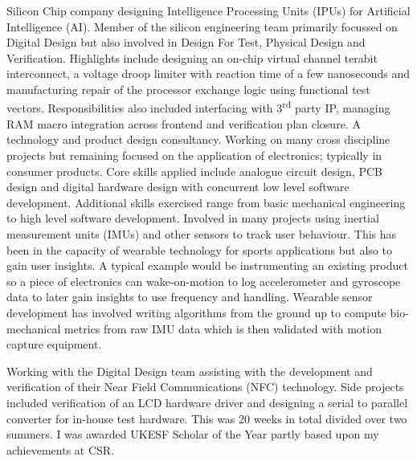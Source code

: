 \documentclass[11pt,a4paper,sans]{moderncv}
\begin{document}
      { Silicon Chip company designing Intelligence Processing Units (IPUs) for Artificial Intelligence (AI). 
        Member of the silicon engineering team primarily focussed on Digital Design but also involved in Design For Test, 
        Physical Design and Verification. Highlights include designing an on-chip virtual channel terabit interconnect, 
        a voltage droop limiter with reaction time of a few nanoseconds and manufacturing repair of the processor exchange logic
        using functional test vectors. Responsibilities also included interfacing with 3\textsuperscript{rd} party IP, managing RAM macro
        integration across frontend and verification plan closure.
        }
        {}
      {  A technology and product design consultancy. 
         Working on many cross discipline projects but remaining focused on the application of electronics; typically in consumer products.
         Core skills applied include analogue circuit design, PCB design and digital hardware design with concurrent low level software development. 
         Additional skills exercised range from basic mechanical engineering to high level software development.       
        Involved in many projects using inertial measurement units (IMUs) and other sensors to track user behaviour. This has been in the capacity of wearable technology for sports applications but also to gain user insights. A typical example would be instrumenting an existing product so a piece of electronics can wake-on-motion to log accelerometer and gyroscope data to later gain insights to use frequency and handling. Wearable sensor development has involved writing algorithms from the ground up to compute bio-mechanical metrics from raw IMU data which is then validated with motion capture equipment.
      }

      {Working with the Digital Design team assisting with the development and verification of their Near Field Communications (NFC) technology. 
      Side projects included verification of an LCD hardware driver and designing a serial to parallel converter for in-house test hardware.
      This was 20 weeks in total divided over two summers. I was awarded UKESF Scholar of the Year partly based upon my achievements at CSR.}
\end{document}
